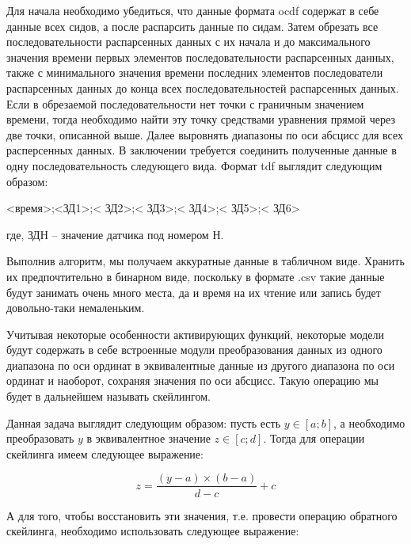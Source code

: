 {  \par \redline Для начала необходимо убедиться, что данные формата ocdf содержат в себе данные всех сидов, а после распарсить данные по сидам. Затем обрезать все последовательности распарсенных данных с их начала и до максимального значения времени первых элементов последовательности распарсенных данных, также с минимального значения времени последних элементов последователи распарсенных данных до конца всех последовательностей распарсенных данных. Если в обрезаемой последовательности нет точки с граничным значением времени, тогда необходимо найти эту точку средствами уравнения прямой через две точки, описанной выше. Далее выровнять диапазоны по оси абсцисс для всех расперсенных данных. В заключении требуется соединить полученные данные в одну последовательность следующего вида. Формат tdf выглядит следующим образом:

  \begin{Center}
  <время>;<ЗД1>;< ЗД2>;< ЗД3>;< ЗД4>;< ЗД5>;< ЗД6>
  \end{Center}

  \par \redline где, ЗДН – значение датчика под номером Н. 

  \par \redline Выполнив алгоритм, мы получаем аккуратные данные в табличном виде. Хранить их предпочтительно в бинарном виде, поскольку в формате .csv такие данные будут занимать очень много места, да и время на их чтение или запись будет довольно-таки немаленьким. 

  \par \redline Учитывая некоторые особенности активирующих функций, некоторые модели будут содержать в себе встроенные модули преобразования данных из одного диапазона по оси ординат в эквивалентные данные из другого диапазона по оси ординат и наоборот, сохраняя значения по оси абсцисс. Такую операцию мы будет в дальнейшем называть скейлингом.

  \par \redline Данная задача выглядит следующим образом: пусть есть $y \in \left[a; b\right]$, а необходимо преобразовать $y$ в эквивалентное значение $z \in \left[c; d\right]$. Тогда для операции скейлинга имеем следующее выражение:

  \begin{equation}
    z = \frac{\left(y - a\right) \times \left(b - a\right)}{d - c} + c
  \end{equation}

  \par \redline А для того, чтобы восстановить эти значения, т.е. провести операцию обратного скейлинга, необходимо использовать следующее выражение: 

}
